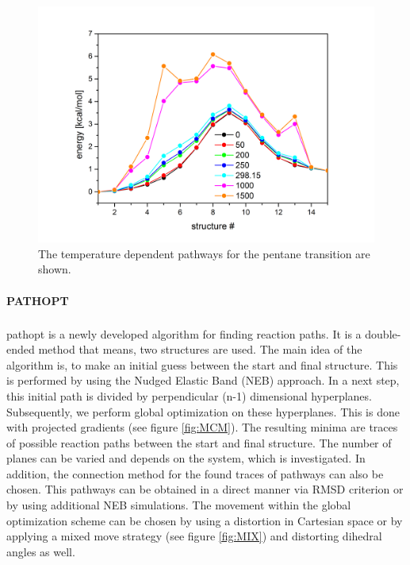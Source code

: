 \documentclass[a4paper,11pt]{scrartcl}
\newcommand{\myCite}[1]{\textsuperscript{\cite{#1}}}
\begin{document}
\begin{itemize}
\begin{itemize}
\begin{figure}[H]
		\center
		\includegraphics[scale=0.4]{NEB/neb_temp_pentane.png}\caption{The temperature dependent pathways for the pentane transition are shown.}
\label{fig:}
\end{figure}



\end{itemize}

\end{itemize}



\newpage

\paragraph{PATHOPT}\ac{pathopt}
\myCite{Grebner2013b,Weber2016} is a newly developed algorithm for finding reaction paths. It is a double-ended method that means, two structures are used. The main idea of the algorithm is, to make an initial guess between the start and final structure. This is performed by using the Nudged Elastic Band (NEB) approach. In a next step, this initial path is divided by perpendicular (n-1) dimensional hyperplanes. Subsequently, we perform global optimization on these hyperplanes. This is done with projected gradients (see figure \ref{fig:MCM}). The resulting minima are traces of possible reaction paths between the start and final structure. The number of planes can be varied and depends on the system, which is investigated. In addition, the connection method for the found traces of pathways can also be chosen. This pathways can be obtained in a direct manner via RMSD criterion or by using additional NEB simulations. The movement within the global optimization scheme can be chosen by using a distortion in Cartesian space or by applying a mixed move strategy (see figure \ref{fig:MIX}) and distorting dihedral angles as well.\newline
\end{document}
